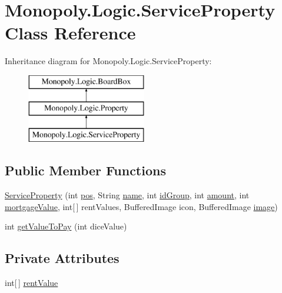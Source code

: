 \hypertarget{class_monopoly_1_1_logic_1_1_service_property}{}\section{Monopoly.\+Logic.\+Service\+Property Class Reference}
\label{class_monopoly_1_1_logic_1_1_service_property}
Inheritance diagram for Monopoly.\+Logic.\+Service\+Property\+:\begin{figure}[H]
\begin{center}
\leavevmode
\includegraphics[height=3.000000cm]{class_monopoly_1_1_logic_1_1_service_property}
\end{center}
\end{figure}
\subsection*{Public Member Functions}
\begin{DoxyCompactItemize}
\item 
\hyperlink{class_monopoly_1_1_logic_1_1_service_property_a75591f31b4e294f849b9fe8e2f1b9cc2}{Service\+Property} (int \hyperlink{class_monopoly_1_1_logic_1_1_board_box_a750c8300a134809e0eb5772b3ba92258}{pos}, String \hyperlink{class_monopoly_1_1_logic_1_1_board_box_ad5cd8d9fc191dc2df82b9fe7766210fd}{name}, int \hyperlink{class_monopoly_1_1_logic_1_1_property_ab42a31cd99e909728aa49c0184f644b8}{id\+Group}, int \hyperlink{class_monopoly_1_1_logic_1_1_property_a3e5525c94c56e900372c5a13a8fe03fb}{amount}, int \hyperlink{class_monopoly_1_1_logic_1_1_property_ae4b874ede5de05f1f5b0ab329c2c58f5}{mortgage\+Value}, int\mbox{[}$\,$\mbox{]} rent\+Values, Buffered\+Image icon, Buffered\+Image \hyperlink{class_monopoly_1_1_logic_1_1_property_a1bd3d29f02147192157c57535fd0eca9}{image})
\item 
int \hyperlink{class_monopoly_1_1_logic_1_1_service_property_acb9a00536f73267802d71fd582581976}{get\+Value\+To\+Pay} (int dice\+Value)
\end{DoxyCompactItemize}
\subsection*{Private Attributes}
\begin{DoxyCompactItemize}
\item 
int\mbox{[}$\,$\mbox{]} \hyperlink{class_monopoly_1_1_logic_1_1_service_property_ab03c954de837e6c827ed4646170ffbb9}{rent\+Value}
\end{DoxyCompactItemize}
